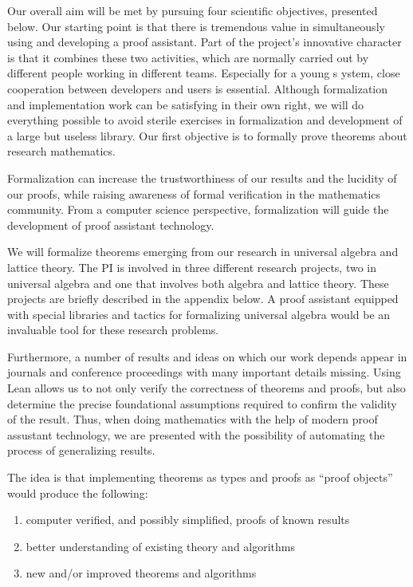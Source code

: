 \documentclass[11pt]{amsart}  %
\begin{document}
Our overall aim will be met by pursuing four scientific objectives, presented below. Our starting point is that there is tremendous value in simultaneously using and developing a proof assistant. Part of the project's innovative character is that it combines these two activities, which are normally carried out by different people working in different teams. Especially for a young s
ystem, close cooperation between developers and users is essential. Although formalization and implementation work can be satisfying in their own right, we will do everything possible to avoid sterile exercises in formalization and development of a large but useless library. Our first objective is to formally prove theorems about research mathematics.

Formalization can increase the trustworthiness of our results and the lucidity of our proofs, while raising awareness of formal verification in the mathematics community. From a computer science perspective, formalization will guide the development of proof assistant technology.

We will formalize theorems emerging from our research in universal algebra and lattice theory. The PI is involved in three different research projects, two in universal algebra and one that involves both algebra and lattice theory.  These projects are briefly described in the appendix below. A proof assistant equipped with special libraries and tactics for formalizing universal algebra would be an invaluable tool for these research problems. 

Furthermore, a number of results and ideas on which our work depends appear in journals and conference proceedings with many important details missing.  Using Lean allows us to not only verify the correctness of theorems and proofs, but
also determine the precise foundational assumptions required to confirm the validity of the result. Thus, when doing mathematics with the help of modern proof assustant technology,  we are presented with the possibility of automating the process of generalizing results.

The idea is that implementing theorems as types
and proofs as ``proof objects'' would produce the following:
\begin{enumerate}
\item computer verified, and possibly simplified, proofs of known results
\item better understanding of existing theory and algorithms
\item new and/or improved theorems and algorithms
\end{enumerate}
\end{document}
